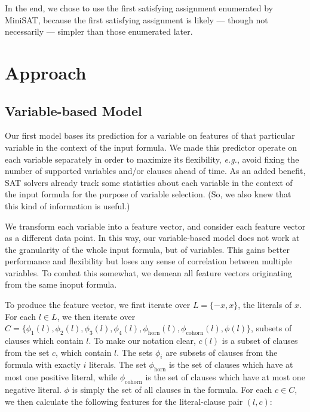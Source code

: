 \documentclass{article}
\begin{document}
In the end, we chose to use the first satisfying assignment enumerated by
MiniSAT, because the first satisfying assignment is likely --- though not
necessarily --- simpler than those enumerated later.

\section*{Approach}

\subsection*{Variable-based Model}
Our first model bases its prediction for a variable on features of that
particular variable in the context of the input formula. We made this predictor
operate on each variable separately in order to maximize its flexibility,
\textit{e.g.}, avoid fixing the number of supported variables and/or clauses
ahead of time. As an added benefit, SAT solvers already track some statistics
about each variable in the context of the input formula for the purpose of
variable selection. (So, we also knew that this kind of information is useful.)

We transform each variable into a feature vector, and consider each
feature vector as a different data point. In this way, our variable-based model
does not work at the granularity of the whole input formula, but of variables.
This gains better performance and flexibility but loses any sense of correlation
between multiple variables. To combat this somewhat, we demean all feature
vectors originating from the same inoput formula.

To produce the feature vector, we first iterate over $L = \{-x, x\}$, the
literals of $x$. For each $l \in L$, we then iterate over $C = \{\phi_1(l),
\phi_2(l), \phi_3(l), \phi_4(l), \phi_{\text{horn}}(l), \phi_{\text{cohorn}}(l),
\phi(l)\}$, subsets of clauses which contain $l$. To make our notation clear,
$c(l)$ is a subset of clauses from the set $c$, which contain $l$. The sets
$\phi_i$ are subsets of clauses from the formula with exactly $i$ literals. The
set $\phi_{\text{horn}}$ is the set of clauses which have at most one positive
literal, while $\phi_{\text{cohorn}}$ is the set of clauses which have at most
one negative literal. $\phi$ is simply the set of all clauses in the formula.
For each $c \in C$, we then calculate the following features for the
literal-clause pair $(l, c)$:
\end{document}
